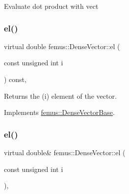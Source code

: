 \begin{DoxyItemize}
\item Evaluate dot product with {\ttfamily vect} 
\end{DoxyItemize}\mbox{\label{classfemus_1_1_dense_vector_aff2ffaa4a8b334a0c913fa0d79223e30}} 
\subsubsection{\texorpdfstring{el()}{el()}\hspace{0.1cm}{\footnotesize\ttfamily [1/2]}}
{\footnotesize\ttfamily virtual double femus\+::\+Dense\+Vector\+::el (\begin{DoxyParamCaption}\item[{const unsigned int}]{i }\end{DoxyParamCaption}) const\hspace{0.3cm}{\ttfamily [inline]}, {\ttfamily [virtual]}}


\begin{DoxyItemize}
\item \begin{DoxyReturn}{Returns}
the {\ttfamily }(i) element of the vector. 
\end{DoxyReturn}

\end{DoxyItemize}

Implements \mbox{\hyperlink{classfemus_1_1_dense_vector_base_ae2a833cdebb39552185cb66b139758e8}{femus\+::\+Dense\+Vector\+Base}}.

\mbox{\label{classfemus_1_1_dense_vector_abee121241acbc2d29a7e54fc27588357}} 
\subsubsection{\texorpdfstring{el()}{el()}\hspace{0.1cm}{\footnotesize\ttfamily [2/2]}}
{\footnotesize\ttfamily virtual double\& femus\+::\+Dense\+Vector\+::el (\begin{DoxyParamCaption}\item[{const unsigned int}]{i }\end{DoxyParamCaption})\hspace{0.3cm}{\ttfamily [inline]}, {\ttfamily [virtual]}}


